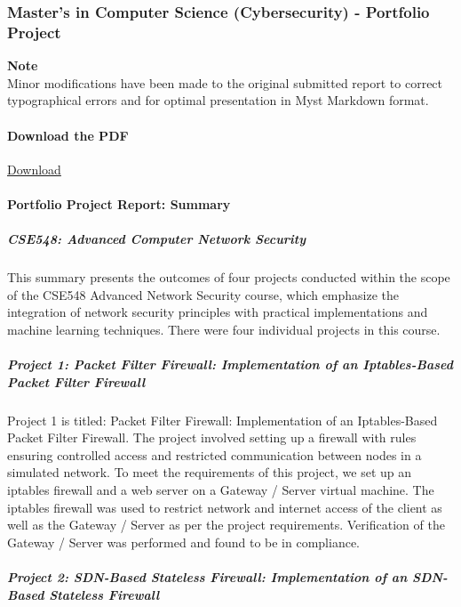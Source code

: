 \subsubsection{Master's in Computer Science (Cybersecurity) - Portfolio Project}

\begin{framed}
\textbf{Note}\\
Minor modifications have been made to the original submitted report to correct typographical errors and for optimal presentation in Myst Markdown format.
\end{framed}

\paragraph{Download the PDF}

\href{/Mark\_Khusid\_Portfoli-d2f321973ee334c9654273bb679c38cd.pdf}{Download}

\paragraph{Portfolio Project Report: Summary}

\subparagraph{CSE548: Advanced Computer Network Security}

This summary presents the outcomes of four projects conducted within the scope of the CSE548 Advanced Network Security course, which emphasize the integration of network security principles with practical implementations and machine learning techniques. There were four individual projects in this course.

\subparagraph{Project 1: Packet Filter Firewall: Implementation of an Iptables-Based Packet Filter Firewall}

Project 1 is titled: Packet Filter Firewall: Implementation of an Iptables-Based Packet Filter Firewall.  The project involved setting up a firewall with rules ensuring controlled access and restricted communication between nodes in a simulated network.  To meet the requirements of this project, we set up an iptables firewall and a web server on a Gateway / Server virtual machine.  The iptables firewall was used to restrict network and internet access of the client as well as the  Gateway / Server as per the project requirements.  Verification of the Gateway / Server was performed and found to be in compliance.

\subparagraph{Project 2: SDN-Based Stateless Firewall: Implementation of an SDN-Based Stateless Firewall}


